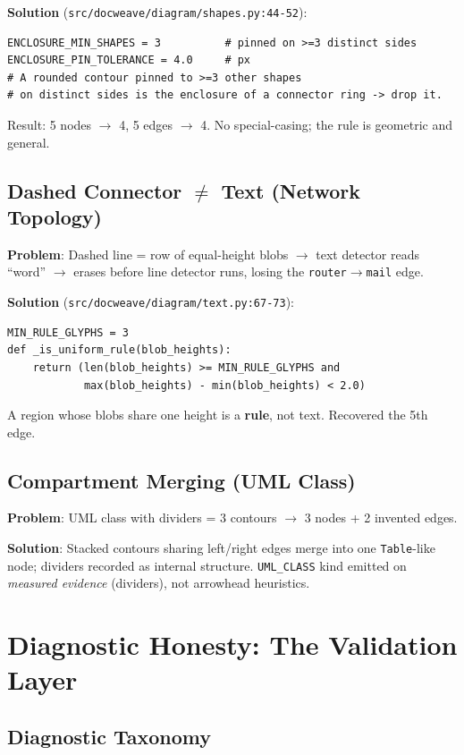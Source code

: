 \documentclass[10pt, conference, compsocconf]{IEEEtran}
\theoremstyle{plain}
\begin{document}
\textbf{Solution} (\texttt{src/docweave/diagram/shapes.py:44-52}):
\begin{lstlisting}[style=code]
ENCLOSURE_MIN_SHAPES = 3          # pinned on >=3 distinct sides
ENCLOSURE_PIN_TOLERANCE = 4.0     # px
# A rounded contour pinned to >=3 other shapes 
# on distinct sides is the enclosure of a connector ring -> drop it.
\end{lstlisting}
Result: 5 nodes $\to$ 4, 5 edges $\to$ 4. No special-casing; the rule is geometric and general.

\subsection{Dashed Connector $\neq$ Text (Network Topology)}
\label{sec:dashed}

\textbf{Problem}: Dashed line = row of equal-height blobs $\to$ text detector reads ``word'' $\to$ erases before line detector runs, losing the \texttt{router}$\to$\texttt{mail} edge.

\textbf{Solution} (\texttt{src/docweave/diagram/text.py:67-73}):
\begin{lstlisting}[style=code]
MIN_RULE_GLYPHS = 3
def _is_uniform_rule(blob_heights):
    return (len(blob_heights) >= MIN_RULE_GLYPHS and 
            max(blob_heights) - min(blob_heights) < 2.0)
\end{lstlisting}
A region whose blobs share one height is a \textbf{rule}, not text. Recovered the 5th edge.

\subsection{Compartment Merging (UML Class)}
\label{sec:compartment}

\textbf{Problem}: UML class with dividers = 3 contours $\to$ 3 nodes + 2 invented edges.

\textbf{Solution}: Stacked contours sharing left/right edges merge into one \texttt{Table}-like node; dividers recorded as internal structure. \texttt{UML\_CLASS} kind emitted on \textit{measured evidence} (dividers), not arrowhead heuristics.

\section{Diagnostic Honesty: The Validation Layer}
\label{sec:diagnostics}

\subsection{Diagnostic Taxonomy}
\end{document}
